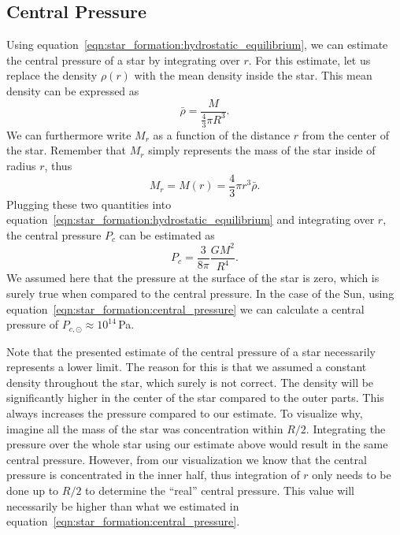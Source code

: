 \subsection{Central Pressure}

Using equation~\eqref{eqn:star_formation:hydrostatic_equilibrium}, we can estimate the central pressure of a star by integrating over $r$. For this estimate, let us replace the density $\rho(r)$ with the mean density inside the star. This mean density can be expressed as
\begin{equation}
    \bar{\rho} = \frac{M}{\frac{4}{3} \pi R^3}.
\end{equation}
We can furthermore write $M_r$ as a function of the distance $r$ from the center of the star. Remember that $M_r$ simply represents the mass of the star inside of radius $r$, thus
\begin{equation}
    M_r = M(r) = \frac{4}{3} \pi r^3 \bar{\rho}.
\end{equation}
Plugging these two quantities into equation~\eqref{eqn:star_formation:hydrostatic_equilibrium} and integrating over $r$, the central pressure $P_c$ can be estimated as
\begin{equation}
    P_c = \frac{3}{8\pi}\frac{GM^{2}}{R^{4}}.
    \label{eqn:star_formation:central_pressure}
\end{equation}
We assumed here that the pressure at the surface of the star is zero, which is surely true when compared to the central pressure. In the case of the Sun, using equation~\eqref{eqn:star_formation:central_pressure} we can calculate a central pressure of $P_{c,\odot} \approx 10^{14}$\,Pa.

Note that the presented estimate of the central pressure of a star necessarily represents a lower limit. The reason for this is that we assumed a constant density throughout the star, which surely is not correct. The density will be significantly higher in the center of the star compared to the outer parts. This always increases the pressure compared to our estimate. To visualize why, imagine all the mass of the star was concentration within $R/2$. Integrating the pressure over the whole star using our estimate above would result in the same central pressure. However, from our visualization we know that the central pressure is concentrated in the inner half, thus integration of $r$ only needs to be done up to $R/2$ to determine the ``real'' central pressure. This value will necessarily be higher than what we estimated in equation~\eqref{eqn:star_formation:central_pressure}.

